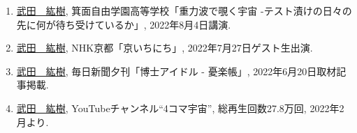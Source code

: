 \documentclass[uplatex, 11pt]{jsarticle}
\begin{document}
\begin{enumerate}
\item \uline{武田　紘樹}, 箕面自由学園高等学校「重力波で覗く宇宙 -テスト漬けの日々の先に何が待ち受けているか」, 2022年8月4日講演.\\

\item \uline{武田　紘樹}, NHK京都「京いちにち」, 2022年7月27日ゲスト生出演.\\

\item \uline{武田　紘樹}, 毎日新聞夕刊「博士アイドル - 憂楽帳」, 2022年6月20日取材記事掲載.\\

\item \uline{武田　紘樹}, YouTubeチャンネル“4コマ宇宙”,  総再生回数27.8万回, 2022年2月より.\\
\end{enumerate}

\end{document}
